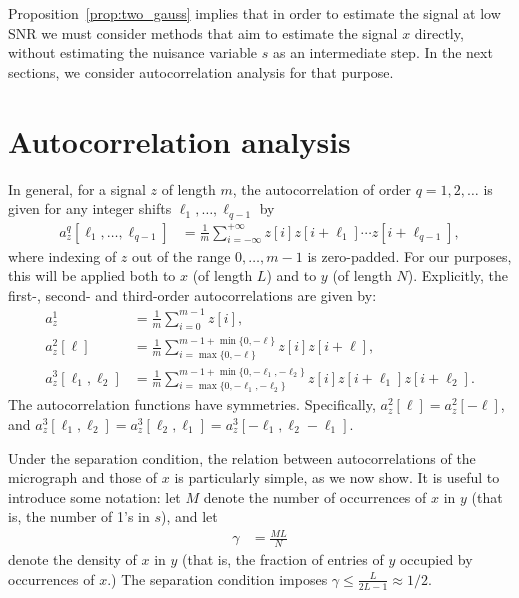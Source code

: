 \documentclass[9pt,twocolumn,twoside,lineno]{pnas-new}
\begin{document}
Proposition~\ref{prop:two_gauss} implies that in order to estimate the signal at low SNR we must consider methods that aim to estimate the signal $x$ directly, without estimating the nuisance variable $s$ as an intermediate step.
In the next sections, we consider autocorrelation analysis for that purpose.

\section{Autocorrelation analysis} \label{sec:AC_analysis}

In general, for a signal $z$ of length $m$, the autocorrelation of order $q = 1, 2, \ldots$ is given for any integer shifts $\ell_1, \ldots, \ell_{q-1}$ by
\begin{align}
a_z^q[\ell_1,\ldots,\ell_{q-1}]  & = \frac{1}{m} \sum_{i=-\infty}^{+\infty} z[i]z[i+\ell_1]\cdots z[i+\ell_{q-1}],
\label{eq:ac_general}
\end{align}
where indexing of $z$ out of the range $0, \ldots, m-1$ is zero-padded.
For our purposes, this will be applied both to $x$ (of length $L$) and to $y$ (of length $N$).
Explicitly, the first-, second- and third-order autocorrelations are given by: %
\begin{align} 
a_z^1 & = \frac{1}{m} \sum_{i=0}^{m-1} z[i], \nonumber\\
a_z^2[\ell] & = \frac{1}{m} \sum_{i = \max\{0, -\ell\}}^{m-1 + \min\{0, -\ell\}} z[i]z[i+\ell], \nonumber\\
a_z^3[\ell_1,\ell_2] & = \frac{1}{m} \sum_{i = \max\{0, -\ell_1, -\ell_2\}}^{m-1 + \min\{0, -\ell_1, -\ell_2\}} z[i]z[i+\ell_1]z[i+\ell_2]. \label{eq:ac_special}
\end{align}
The autocorrelation functions have symmetries. Specifically, $a_z^2[\ell] = a_z^2[-\ell]$, and
$a_z^3[\ell_1,\ell_2] = a_z^3[\ell_2,\ell_1]=a_z^3[-\ell_1,\ell_2-\ell_1].
$

Under the separation condition, the relation between autocorrelations of the micrograph and those of $x$ is particularly simple, as we now show. It is useful to introduce some notation: let $M$ denote the number of occurrences of $x$ in $y$ (that is, the number of 1's in $s$), and let
\begin{align}
	\gamma & = \frac{M L}{N}
	\label{eq:gamma}
\end{align}
denote the density of $x$ in $y$ (that is, the fraction of entries of $y$ occupied by occurrences of $x$.) The separation condition %
imposes $\gamma\leq\frac{L}{2L-1}\approx 1/2$.
\end{document}
